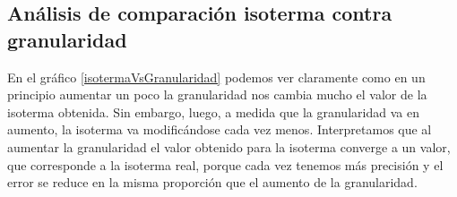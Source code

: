 \subsection{Análisis de comparación isoterma contra granularidad}
En el gráfico \ref{isotermaVsGranularidad} podemos ver claramente como en un principio aumentar un poco la granularidad nos cambia mucho el valor de la isoterma obtenida. Sin embargo, luego, a medida que la granularidad va en aumento, la isoterma va modificándose cada vez menos. Interpretamos que al aumentar la granularidad el valor obtenido para la isoterma converge a un valor, que corresponde a la isoterma real, porque cada vez tenemos más precisión y el error se reduce en la misma proporción que el aumento de la granularidad.

